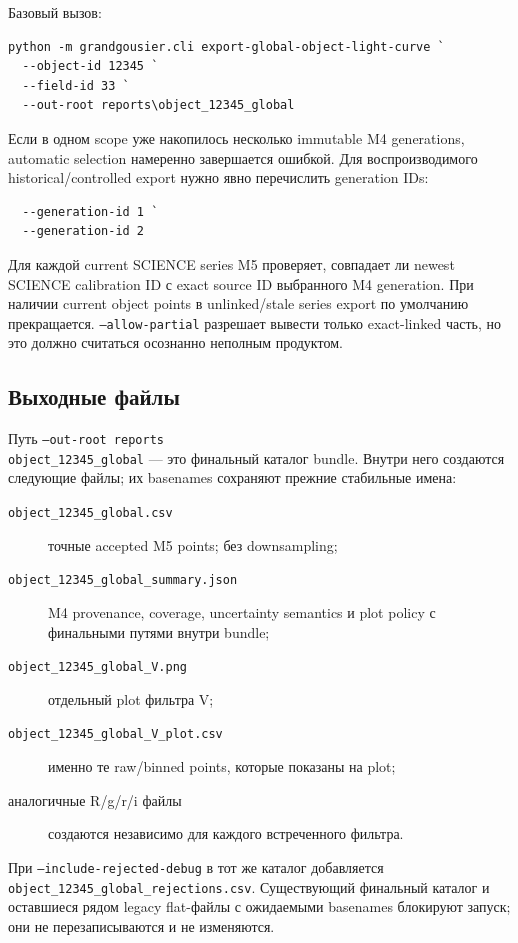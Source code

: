 Базовый вызов:

\begin{lstlisting}
python -m grandgousier.cli export-global-object-light-curve `
  --object-id 12345 `
  --field-id 33 `
  --out-root reports\object_12345_global
\end{lstlisting}

Если в одном scope уже накопилось несколько immutable M4 generations, automatic selection намеренно завершается ошибкой. Для воспроизводимого historical/controlled export нужно явно перечислить generation IDs:

\begin{lstlisting}
  --generation-id 1 `
  --generation-id 2
\end{lstlisting}

Для каждой current SCIENCE series M5 проверяет, совпадает ли newest SCIENCE calibration ID с exact source ID выбранного M4 generation. При наличии current object points в unlinked/stale series export по умолчанию прекращается. \texttt{--allow-partial} разрешает вывести только exact-linked часть, но это должно считаться осознанно неполным продуктом.

\subsection{Выходные файлы}

Путь \texttt{--out-root reports\\object\_12345\_global} --- это финальный каталог bundle.
Внутри него создаются следующие файлы; их basenames сохраняют прежние стабильные имена:

\begin{description}
  \item[\texttt{object\_12345\_global.csv}] точные accepted M5 points; без downsampling;
  \item[\texttt{object\_12345\_global\_summary.json}] M4 provenance, coverage, uncertainty semantics и plot policy с финальными путями внутри bundle;
  \item[\texttt{object\_12345\_global\_V.png}] отдельный plot фильтра V;
  \item[\texttt{object\_12345\_global\_V\_plot.csv}] именно те raw/binned points, которые показаны на plot;
  \item[аналогичные R/g/r/i файлы] создаются независимо для каждого встреченного фильтра.
\end{description}

При \texttt{--include-rejected-debug} в тот же каталог добавляется
\texttt{object\_12345\_global\_rejections.csv}. Существующий финальный каталог и
оставшиеся рядом legacy flat-файлы с ожидаемыми basenames блокируют запуск; они не
перезаписываются и не изменяются.

